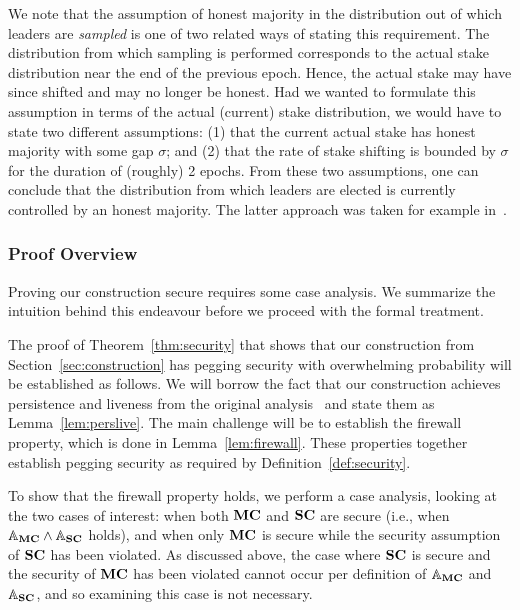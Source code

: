 \begin{remark}
    We note that the assumption of honest majority in the distribution out of
    which leaders are \emph{sampled} is one of two related ways of stating
    this requirement. The distribution from which sampling is performed
    corresponds to the actual stake distribution near the end of the previous
    epoch. Hence, the actual stake may have since shifted and may no longer be
    honest. Had we wanted to formulate this assumption in terms of the actual
    (current) stake distribution, we would have to state two different
    assumptions: (1) that the current actual stake has honest majority with some
    gap $\sigma$; and (2) that the rate of stake shifting is bounded by $\sigma$
    for the duration of (roughly) 2 epochs.  From these two assumptions, one can
    conclude that the distribution from which leaders are elected is currently
    controlled by an honest majority.  The latter approach was taken for example
    in~\cite{ouroboros}.
\end{remark}

\subsubsection{Proof Overview}

Proving our construction secure requires some case analysis. We summarize the
intuition behind this endeavour before we proceed with the formal treatment.

The proof of Theorem~\ref{thm:security} that shows that
our construction from Section~\ref{sec:construction} has pegging security with overwhelming probability will be
established as follows. We will borrow the fact that our construction achieves
persistence and liveness
from the original analysis~\cite{ouroboros} and state
them as Lemma~\ref{lem:perslive}. The main challenge will
be to establish the firewall property, which is done in
Lemma~\ref{lem:firewall}. These properties together establish pegging
security as required by Definition~\ref{def:security}.

To show that the firewall property holds, we
perform a case analysis, looking at
the two cases of interest: when both $\mathbf{MC}$ and
$\mathbf{SC}$ are secure (i.e., when $\mathbb{A}_{\mathbf{MC}}\land\mathbb{A}_{\mathbf{SC}}$ holds), and when only $\mathbf{MC}$ is secure while the security assumption of
$\mathbf{SC}$ has been violated.
As discussed above, the case where $\mathbf{SC}$ is secure and
the security of $\mathbf{MC}$ has been violated cannot occur per definition of
$\mathbb{A}_{\mathbf{MC}}$ and $\mathbb{A}_{\mathbf{SC}}$, and so examining this
case is not necessary.

